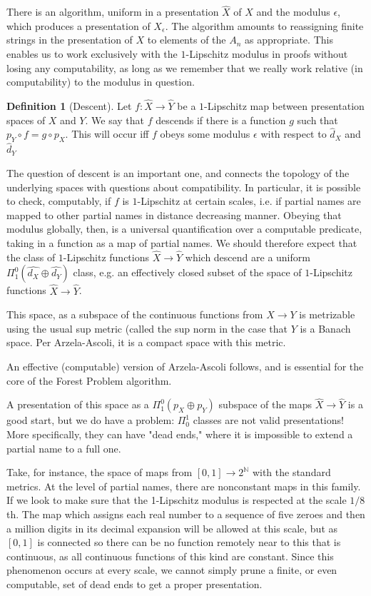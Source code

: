 \documentclass{journal}
\theoremstyle{definition}
\newtheorem{dfn}[thm]{Definition}
\newcommand{\N}{\mathbb{N}}
\begin{document}
There is an algorithm, uniform in a presentation $\hat{X}$ of $X$ and the modulus $\epsilon$, which produces a presentation of $X_\epsilon$. The algorithm amounts to reassigning finite strings in the presentation of $X$ to elements of the $A_n$ as appropriate. This enables us to work exclusively with the $1$-Lipschitz modulus in proofs without losing any computability, as long as we remember that we really work relative (in computability) to the modulus in question.

\begin{dfn}[Descent]
Let $f:\hat{X}\rightarrow \hat{Y}$ be a $1$-Lipschitz map between presentation spaces of $X$ and $Y$. We say that $f$ descends if there is a function $g$ such that $p_Y\circ f = g\circ p_X$. This will occur iff $f$ obeys some modulus $\epsilon$ with respect to $\hat{d}_X$ and $\hat{d}_Y$
\end{dfn}
\label{dfn:descentfunc}
The question of descent is an important one, and connects the topology of the underlying spaces with questions about compatibility. In particular, it is possible to check, computably, if $f$ is $1$-Lipschitz at certain scales, i.e. if partial names are mapped to other partial names in distance decreasing manner. Obeying that modulus globally, then, is a universal quantification over a computable predicate, taking in a function as a map of partial names. We should therefore expect that the class of $1$-Lipschitz functions $\hat{X}\rightarrow \hat{Y}$ which descend are a uniform $\Pi^0_1(\hat{d_X}\oplus \hat{d_Y})$ class, e.g. an effectively closed subset of the space of $1$-Lipschitz functions $\hat{X}\rightarrow \hat{Y}$.

This space, as a subspace of the continuous functions from $X\rightarrow Y$ is metrizable using the usual sup metric (called the sup norm in the case that $Y$ is a Banach space. Per Arzela-Ascoli, it is a compact space with this metric.

An effective (computable) version of Arzela-Ascoli follows, and is essential for the core of the Forest Problem algorithm.

A presentation of this space as a $\Pi^0_1(p_X\oplus p_Y)$ subspace of the maps $\hat{X}\rightarrow \hat{Y}$ is a good start, but we do have a problem: $\Pi_0^1$ classes are not valid presentations! More specifically, they can have "dead ends," where it is impossible to extend a partial name to a full one. 

Take, for instance, the space of maps from $[0,1]\rightarrow 2^\N$ with the standard metrics. At the level of partial names, there are nonconstant maps in this family. If we look to make sure that the 1-Lipschitz modulus is respected at the scale $1/8$th. The map which assigns each real number to a sequence of five zeroes and then a million digits in its decimal expansion will be allowed at this scale, but as $[0,1]$ is connected so there can be no function remotely near to this that is continuous, as all continuous functions of this kind are constant. Since this phenomenon occurs at every scale, we cannot simply prune a finite, or even computable, set of dead ends to get a proper presentation.
\end{document}
